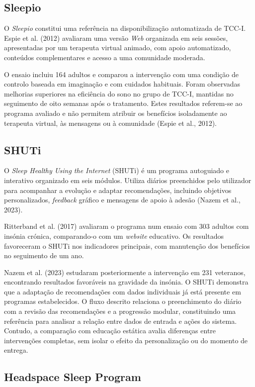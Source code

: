 \subsection*{Sleepio}

O \textit{Sleepio} constitui uma referência na disponibilização automatizada de TCC-I. Espie et al. (2012) avaliaram uma versão \textit{Web} organizada em seis sessões, apresentadas por um terapeuta virtual animado, com apoio automatizado, conteúdos complementares e acesso a uma comunidade moderada.

O ensaio incluiu 164 adultos e comparou a intervenção com uma condição de controlo baseada em imaginação e com cuidados habituais. Foram observadas melhorias superiores na eficiência do sono no grupo de TCC-I, mantidas no seguimento de oito semanas após o tratamento. Estes resultados referem-se ao programa avaliado e não permitem atribuir os benefícios isoladamente ao terapeuta virtual, às mensagens ou à comunidade (Espie et al., 2012).

\subsection*{SHUTi}

O \textit{Sleep Healthy Using the Internet} (SHUTi) é um programa autoguiado e interativo organizado em seis módulos. Utiliza diários preenchidos pelo utilizador para acompanhar a evolução e adaptar recomendações, incluindo objetivos personalizados, \textit{feedback} gráfico e mensagens de apoio à adesão (Nazem et al., 2023).

Ritterband et al. (2017) avaliaram o programa num ensaio com 303 adultos com insónia crónica, comparando-o com um \textit{website} educativo. Os resultados favoreceram o SHUTi nos indicadores principais, com manutenção dos benefícios no seguimento de um ano.

Nazem et al. (2023) estudaram posteriormente a intervenção em 231 veteranos, encontrando resultados favoráveis na gravidade da insónia. O SHUTi demonstra que a adaptação de recomendações com dados individuais já está presente em programas estabelecidos. O fluxo descrito relaciona o preenchimento do diário com a revisão das recomendações e a progressão modular, constituindo uma referência para analisar a relação entre dados de entrada e ações do sistema. Contudo, a comparação com educação estática avalia diferenças entre intervenções completas, sem isolar o efeito da personalização ou do momento de entrega.

\subsection*{Headspace Sleep Program}

